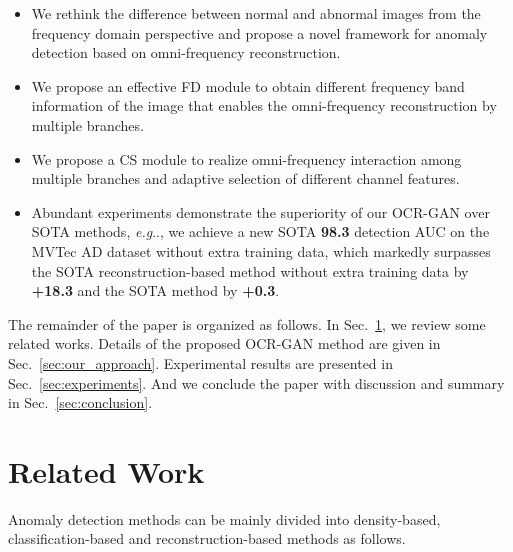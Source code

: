 \documentclass[lettersize,journal]{IEEEtran}
\makeatletter
\DeclareRobustCommand\onedot{\futurelet\@let@token\@onedot}
\def\@onedot{\ifx\@let@token.\else.\null\fi\xspace}
\def\eg{\emph{e.g}\onedot} \def\Eg{\emph{E.g}\onedot}
\makeatother
\begin{document}
\begin{itemize}
    \item We rethink the difference between normal and abnormal images from the frequency domain perspective and propose a novel framework for anomaly detection based on omni-frequency reconstruction.
    \item We propose an effective FD module to obtain different frequency band information of the image that enables the omni-frequency reconstruction by multiple branches.
    \item We propose a CS module to realize omni-frequency interaction among multiple branches and adaptive selection of different channel features.
    \item Abundant experiments demonstrate the superiority of our OCR-GAN over SOTA methods, \eg, we achieve a new SOTA \textbf{98.3} detection AUC on the MVTec AD dataset without extra training data, which markedly surpasses the SOTA reconstruction-based method without extra training data by \textbf{+18.3} and the SOTA method by \textbf{+0.3}.
\end{itemize}

The remainder of the paper is organized as follows. In Sec.~\ref{sec:related_work}, we review some related works. Details of the proposed OCR-GAN method are given in Sec.~\ref{sec:our_approach}. Experimental results are presented in Sec.~\ref{sec:experiments}. And we conclude the paper with discussion and summary in Sec.~\ref{sec:conclusion}.

\section{Related Work}\label{sec:related_work}
Anomaly detection methods can be mainly divided into density-based, classification-based and reconstruction-based methods as follows.
\end{document}
